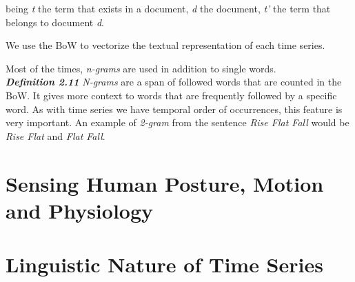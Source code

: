 being \textit{t} the term that exists in a document, \textit{d} the document, \textit{t'} the term that belongs to document \textit{d}.

We use the BoW to vectorize the textual representation of each time series.

Most of the times, \textit{n-grams} are used in addition to single words.\\

\textit{\textbf{Definition 2.11}} \space \space \textit{N-grams} are a span of followed words that are counted in the BoW. It gives more context to words that are frequently followed by a specific word. As with time series we have temporal order of occurrences, this feature is very important. An example of \textit{2-gram} from the sentence \textit{Rise Flat Fall} would be \textit{Rise Flat} and \textit{Flat Fall}.

\section{Sensing Human Posture, Motion and Physiology}
\label{sec:sensor}


\section{Linguistic Nature of Time Series} %
\label{sec:linguistic}


%




